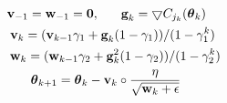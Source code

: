 \begin{align}
    \label{formular:adam}
    \textbf{v}_{-1} = \textbf{w}_{-1} = \textbf{0}, \hspace{0.6cm}
    \textbf{g}_k = \bigtriangledown C_{j_k}(\boldsymbol\theta_k) \hspace{0.4cm} \nonumber\\
    \textbf{v}_k = (\textbf{v}_{k-1}\gamma_1 + \textbf{g}_k (1-\gamma_1))/(1 - \gamma_1^k) \hspace{0.15cm} \nonumber\\
    \textbf{w}_k = (\textbf{w}_{k-1}\gamma_2 + \textbf{g}_k^2 (1-\gamma_2))/(1 - \gamma_2^k) \nonumber\\
    \boldsymbol\theta_{k+1} = \boldsymbol\theta_k - \textbf{v}_k \circ \frac{\eta}{\sqrt{\textbf{w}_k + \epsilon}} \hspace{1.1cm}
\end{align}